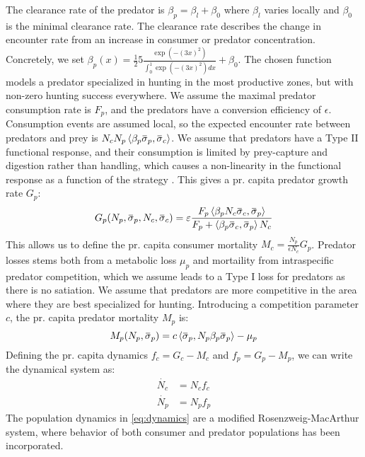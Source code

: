 The clearance rate of the predator is $\beta_p = \beta_{l} + \beta_0$ where $\beta_l$ varies locally and $\beta_0$ is the minimal clearance rate. The clearance rate describes the change in encounter rate from an increase in consumer or predator concentration. Concretely, we set $\beta_p(x) = \frac{1}{2}5 \frac{\exp(-(3 x)^2)}{\int_0^1 \exp(-(3 x)^2) dx} + \beta_0$. The chosen function models a predator specialized in hunting in the most productive zones, but with non-zero hunting success everywhere. We assume the maximal predator consumption rate is $F_p$, and the predators have a conversion efficiency of $\epsilon$. Consumption events are assumed local, so the expected encounter rate between predators and prey is $N_c N_p \ip{\beta_p \overbar{\sigma}_p}{\overbar{\sigma}_c}$. We assume that predators have a Type II functional response, and their consumption is limited by prey-capture and digestion rather than handling, which causes a non-linearity in the functional response as a function of the strategy \citep{Kioerboe2018}. This gives a pr. capita predator growth rate $G_p$:
\begin{equation}
  G_p(N_p, \overbar{\sigma}_p, N_c, \overbar{\sigma}_c )= \epsilon\frac{F_p \ip{\beta_p N_c\overbar{\sigma}_c}{\overbar{\sigma}_p} }{F_p + \ip{\beta_p \overbar{\sigma}_c}{\overbar{\sigma}_p} N_c}
\end{equation}
This allows us to define the pr. capita consumer mortality $M_c = \frac{N_p}{\epsilon N_c}G_p$. Predator losses stems both from a metabolic loss $\mu_p$ and mortaility from intraspecific predator competition, which we assume leads to a Type I loss for predators as there is no satiation. We assume that predators are more competitive in the area where they are best specialized for hunting. Introducing a competition parameter $c$, the pr. capita predator mortality $M_p$ is:
\begin{equation}
  M_p(N_p, \overbar{\sigma}_p) =  c \ip{\overbar{\sigma}_p}{N_p\beta_p \overbar{\sigma}_p}  - \mu_p
\end{equation}
Defining the pr. capita dynamics $f_c = G_c - M_c$ and $f_p = G_p - M_p$, we can write the dynamical system as:
\begin{equation}
  \label{eq:dynamics}
  \begin{split}
    \dot{N_c} &= N_c f_c \\
    \dot{N_p} &= N_p f_p
  \end{split}
\end{equation}
The population dynamics in \cref{eq:dynamics} are a modified Rosenzweig-MacArthur system, where behavior of both consumer and predator populations has been incorporated.
